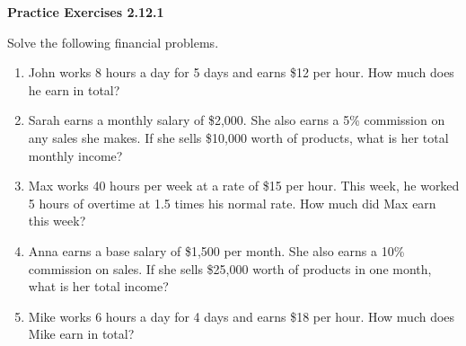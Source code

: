  \vspace{1ex}
\noindent\textbf{Practice Exercises 2.12.1}

\vspace{0.75ex}


Solve the following financial problems. 
\begin{enumerate}[noitemsep, label = \color{blue}\arabic*. ]
    \item John works 8 hours a day for 5 days and earns \$12 per hour. How much does he earn in total?
    \item Sarah earns a monthly salary of \$2,000. She also earns a 5\% commission on any sales she makes. If she sells \$10,000 worth of products, what is her total monthly income?
    \item Max works 40 hours per week at a rate of \$15 per hour. This week, he worked 5 hours of overtime at 1.5 times his normal rate. How much did Max earn this week?
    \item Anna earns a base salary of \$1,500 per month. She also earns a 10\% commission on sales. If she sells \$25,000 worth of products in one month, what is her total income?
    \item Mike works 6 hours a day for 4 days and earns \$18 per hour. How much does Mike earn in total?
\end{enumerate}

